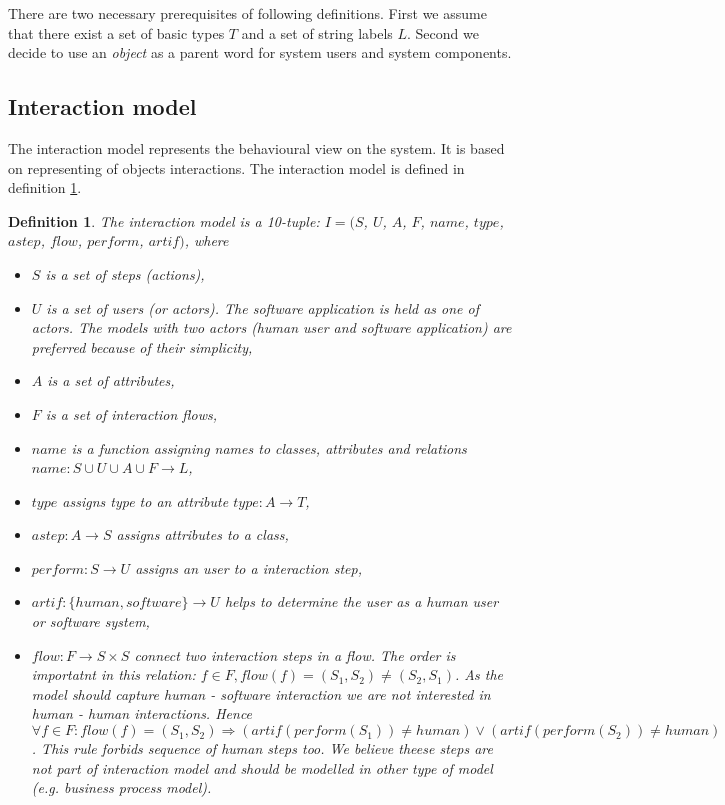 \documentclass[10pt,a4paper]{article}
\newtheorem{mydef}{Definition}
\begin{document}
There are two necessary prerequisites of following definitions. First we assume that there exist a set of basic types $T$ and a set of string labels $L$. Second we decide to use an \textit{object} as a parent word for system users and system components.

\subsection{Interaction model}
The interaction model represents the behavioural view on the system. It is based on representing of objects interactions. The interaction model is defined in definition \ref{def:interActionModel}.

\begin{mydef}
\label{def:interActionModel}
The interaction model is a 10-tuple: $I=(S$, $U$, $A$, $F$, $name$, $type$, $astep$, $flow$, $perform$, $artif)$, where
\begin{itemize}
	\item $S$ is a set of steps (actions), 
	\item $U$ is a set of users (or actors). The software application is held as one of actors. The models with two actors (human user and software application) are preferred because of their simplicity,
	\item $A$ is a set of attributes,
	\item $F$ is a set of interaction flows,
	\item $name$ is a function assigning names to classes, attributes and relations $name: S \cup U \cup A \cup F \rightarrow L$,
	\item $type$ assigns type to an attribute $type: A \rightarrow T$,
	\item $astep: A \rightarrow S$ assigns attributes to a class,
	\item $perform: S \rightarrow U$ assigns an user to a interaction step,
	\item $artif: \lbrace human, software \rbrace \rightarrow U$ helps to determine the user as a human user or software system,
	\item $flow: F \rightarrow S \times S$ connect two interaction steps in a flow. The order is importatnt in this relation: $f \in F, flow(f)=(S_1, S_2)\neq(S_2, S_1)$.  As the model should capture human - software interaction we are not interested in human - human interactions. Hence $\forall f \in F: flow(f)=(S_1,S_2) \Rightarrow (artif(perform(S_1)) \neq human) \vee (artif(perform(S_2))\neq human) $. This rule forbids sequence of human steps too. We believe theese steps are not part of interaction model and should be modelled in other type of model (e.g. business process model).
\end{itemize}
\end{mydef}
\end{document}
